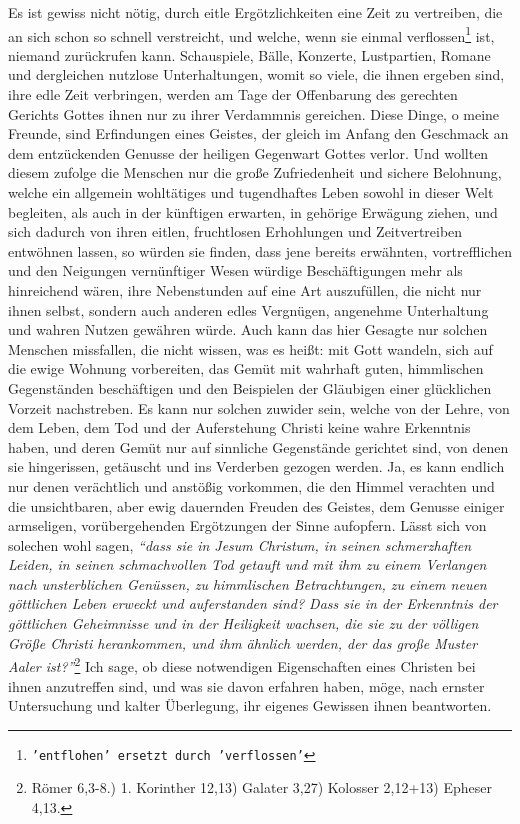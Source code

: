 Es ist gewiss nicht nötig, durch eitle Ergötzlichkeiten eine Zeit zu vertreiben,
die an sich schon so schnell verstreicht, und welche, wenn sie einmal
verflossen\footnote{\texttt{'entflohen' ersetzt 
durch 'verflossen'}} 
ist, niemand zurückrufen kann. Schauspiele, 
Bälle, Konzerte, Lustpartien, Romane
und dergleichen nutzlose Unterhaltungen, womit so viele, die ihnen ergeben sind,
ihre edle Zeit verbringen, werden am Tage der Offenbarung des gerechten Gerichts
Gottes ihnen nur zu ihrer Verdammnis
gereichen. 
Diese Dinge, o meine Freunde,
sind Erfindungen eines Geistes, der gleich im Anfang den Geschmack an dem
entzückenden Genusse der heiligen Gegenwart Gottes verlor. Und wollten diesem
zufolge die Menschen nur die große Zufriedenheit und sichere Belohnung, welche
ein allgemein  wohltätiges und tugendhaftes Leben sowohl in
dieser Welt
begleiten, als auch in der künftigen erwarten, in gehörige Erwägung ziehen, und
sich dadurch von ihren eitlen, fruchtlosen Erhohlungen und Zeitvertreiben
entwöhnen lassen, so würden sie finden, dass jene bereits erwähnten,
vortrefflichen und den Neigungen vernünftiger Wesen würdige Beschäftigungen
mehr als hinreichend wären, ihre Nebenstunden auf eine Art auszufüllen, die
nicht nur ihnen selbst, sondern auch anderen edles Vergnügen, angenehme
Unterhaltung und wahren Nutzen gewähren würde. Auch kann das hier Gesagte nur
solchen Menschen missfallen, die nicht wissen, was es heißt: mit Gott wandeln,
sich auf die ewige Wohnung vorbereiten, das Gemüt mit
wahrhaft guten,
himmlischen Gegenständen beschäftigen und den Beispielen der Gläubigen einer
glücklichen Vorzeit nachstreben. Es kann nur solchen zuwider sein, welche von
der Lehre, von dem Leben, dem Tod und der Auferstehung
Christi keine 
wahre
Erkenntnis haben, und deren Gemüt nur auf sinnliche Gegenstände gerichtet
sind, von denen sie hingerissen, getäuscht und ins Verderben
gezogen werden. Ja,
es kann endlich nur denen verächtlich und anstößig vorkommen, die den Himmel
verachten und die unsichtbaren, aber ewig dauernden Freuden des Geistes, dem
Genusse einiger armseligen, vorübergehenden Ergötzungen der Sinne aufopfern.
Lässt sich von solechen wohl sagen,
\textit{"`dass sie in Jesum Christum, in seinen
schmerzhaften Leiden, in seinen schmachvollen Tod getauft und mit ihm zu einem
Verlangen nach unsterblichen Genüssen, zu himmlischen Betrachtungen, zu einem
neuen göttlichen Leben erweckt und auferstanden sind? Dass sie in der
Erkenntnis der göttlichen Geheimnisse und in der Heiligkeit wachsen, die sie
zu der völligen Größe Christi herankommen, und ihm ähnlich werden, der das große
Muster Aaler ist?"'}\footnote{Römer 6,3-8.) 1. Korinther 12,13) Galater 3,27)
Kolosser 2,12+13)
Epheser 4,13.}
Ich sage, ob diese notwendigen Eigenschaften eines Christen bei
ihnen anzutreffen sind, und was sie davon erfahren haben, möge, nach ernster
Untersuchung und kalter Überlegung, ihr eigenes Gewissen ihnen beantworten.

